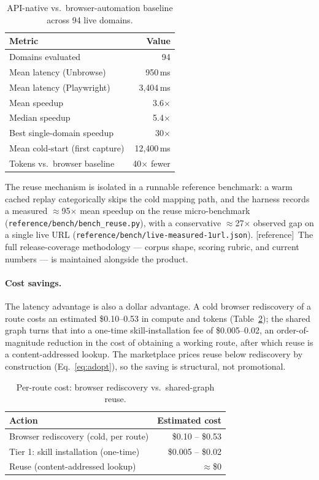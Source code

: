 \documentclass[11pt]{article}
\newcommand{\refimpl}{\textcolor{blue!70!black}{\small[reference]}}
\begin{document}
\begin{table}[h]
\centering
\begin{tabular}{lr}
\toprule
Metric & Value \\
\midrule
Domains evaluated & 94 \\
Mean latency (Unbrowse) & 950\,ms \\
Mean latency (Playwright) & 3{,}404\,ms \\
Mean speedup & 3.6$\times$ \\
Median speedup & 5.4$\times$ \\
Best single-domain speedup & 30$\times$ \\
Mean cold-start (first capture) & 12{,}400\,ms \\
Tokens vs.\ browser baseline & 40$\times$ fewer \\
\bottomrule
\end{tabular}
\caption{API-native vs.\ browser-automation baseline across 94 live domains.}
\label{tab:eval}
\end{table}

The reuse mechanism is isolated in a runnable reference benchmark: a warm cached
replay categorically skips the cold mapping path, and the harness records a measured
$\approx$95$\times$ mean speedup on the reuse micro-benchmark
(\texttt{reference/bench/bench\_reuse.py}), with a conservative $\approx$27$\times$
observed gap on a single live URL
(\texttt{reference/bench/live-measured-1url.json}). \refimpl\ The full
release-coverage methodology --- corpus shape, scoring rubric, and current numbers
--- is maintained alongside the product.

\paragraph{Cost savings.} The latency advantage is also a dollar advantage. A cold
browser rediscovery of a route costs an estimated \$0.10--0.53 in compute and tokens
(Table~\ref{tab:cost}); the shared graph turns that into a one-time
skill-installation fee of \$0.005--0.02, an order-of-magnitude reduction in the cost
of obtaining a working route, after which reuse is a content-addressed lookup. The
marketplace prices reuse below rediscovery by construction (Eq.~\ref{eq:adopt}), so
the saving is structural, not promotional.

\begin{table}[h]
\centering
\begin{tabular}{lr}
\toprule
Action & Estimated cost \\
\midrule
Browser rediscovery (cold, per route) & \$0.10 -- \$0.53 \\
Tier 1: skill installation (one-time) & \$0.005 -- \$0.02 \\
Reuse (content-addressed lookup) & $\approx$\$0 \\
\bottomrule
\end{tabular}
\caption{Per-route cost: browser rediscovery vs.\ shared-graph reuse.}
\label{tab:cost}
\end{table}
\end{document}
